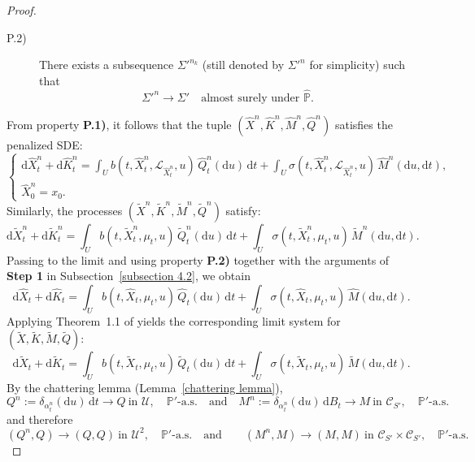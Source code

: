 \documentclass[11pt,amsfonts]{article}
\theoremstyle{plain}
\theoremstyle{assumpstyle}
\numberwithin{equation}{section}
\numberwithin{theorem}{section}
\numberwithin{proposition}{section}
\numberwithin{definition}{section}
\numberwithin{remark}{section}
\numberwithin{corollary}{section}
\numberwithin{lemma}{section}
\begin{document}
\begin{proof}
\begin{description}
    \item[P.2)] There exists a subsequence $ \Sigma'^{n_k} $ (still denoted by $ \Sigma'^n $ for simplicity) such that
    $$
    \Sigma'^n \to \Sigma' \quad \text{almost surely under } \hat{\mathbb{P}}.
    $$
\end{description}
From property \textbf{P.1)}, it follows that the tuple $(\hat{X}^n, \hat{K}^n, \hat{M}^n, \hat{Q}^n) $ satisfies the penalized SDE:
\begin{equation}
\begin{cases}
\mathrm{d}\hat{X}^n_t + \mathrm{d}\hat{K}^n_t= \displaystyle\int_{U} b(t, \hat{X}^n_t, \mathcal{L}_{\hat{X}^n_t}, u)\, \hat{Q}^n_t(\mathrm{d}u)\, \mathrm{d}t 
+ \int_{U} \sigma(t, \hat{X}^n_t, \mathcal{L}_{\hat{X}^n_t}, u)\, \hat{M}^n(\mathrm{d}u, \mathrm{d}t) 
, \\
\hat{X}^n_0 = x_0.
\end{cases}
\end{equation}
Similarly, the processes \( (\tilde{X}^n, \tilde{K}^n, \tilde{M}^n, \tilde{Q}^n) \) satisfy:
\begin{equation}
\mathrm{d}\tilde{X}^n_t+ \mathrm{d}\tilde{K}^n_t = \displaystyle\int_{U} b(t, \tilde{X}^n_t, \mu_t, u)\, \tilde{Q}^n_t(\mathrm{d}u)\, \mathrm{d}t 
+ \int_{U} \sigma(t, \tilde{X}^n_t, \mu_t, u)\, \tilde{M}^n(\mathrm{d}u, \mathrm{d}t) 
.
\end{equation}
Passing to the limit and using property \textbf{P.2)} together with the arguments of \textbf{Step 1} in Subsection~\ref{subsection 4.2}, we obtain
$$
\mathrm{d}\hat{X}_t+\mathrm{d}\hat{K}_t
=\displaystyle\int_U b(t,\hat{X}_t,\mu_t,u)\,\hat{Q}_t(\mathrm{d}u)\,\mathrm{d}t
+\int_U \sigma(t,\hat{X}_t,\mu_t,u)\,\hat{M}(\mathrm{d}u,\mathrm{d}t)
.
$$
Applying Theorem~1.1 of \cite[page~354]{kushnerbook} yields the corresponding limit system for 
$(\tilde{X},\tilde{K},\tilde{M},\tilde{Q})$:
$$
\mathrm{d}\tilde{X}_t+\mathrm{d}\tilde{K}_t
=\displaystyle\int_U b(t,\tilde{X}_t,\mu_t,u)\,\tilde{Q}_t(\mathrm{d}u)\,\mathrm{d}t
+\int_U \sigma(t,\tilde{X}_t,\mu_t,u)\,\tilde{M}(\mathrm{d}u,\mathrm{d}t)
.
$$
By the chattering lemma (Lemma~\ref{chattering lemma}),
$$
Q^n:=\delta_{\alpha^{n}_{t}}(\mathrm{d}u)\, \mathrm{d}t\to Q \ \text{in }\mathcal{U},\quad \mathbb{P}'\text{-a.s.}\quad \text{and} 
\quad
M^n:=\delta_{\alpha^n_t}(\mathrm{d}u)\, \mathrm{d}B_t\to M \ \text{in }\mathcal{C}_{S'},\quad \mathbb{P}'\text{-a.s.}
$$
and therefore
$$
(Q^n,Q)\to(Q,Q)\ \text{in }\mathcal{U}^2,\quad \mathbb{P}'\text{-a.s.} \quad \text{and} 
\qquad
(M^n,M)\to(M,M)\ \text{in }\mathcal{C}_{S'}\times \mathcal{C}_{S'},\quad \mathbb{P}'\text{-a.s.}
$$
\end{proof}
\end{document}
